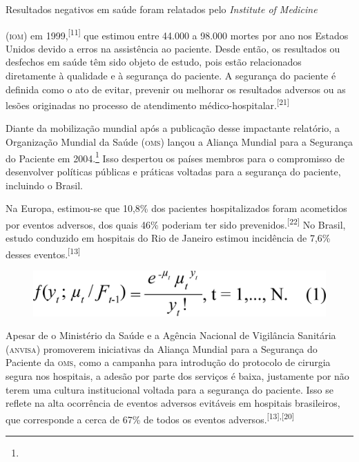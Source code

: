 \documentclass{article}
\begin{document}
Resultados negativos em saúde foram relatados pelo \textit{Institute of
Medicine}

(\textsc{iom}) em 1999,\textsuperscript{[}\textsuperscript{11}\textsuperscript{]}
que estimou entre 44.000 a 98.000 mortes por ano nos Estados Unidos devido a
erros
na assistência ao paciente. Desde então, os resultados ou desfechos em saúde têm
sido objeto
de estudo, pois estão relacionados diretamente à qualidade e à segurança do
paciente. A
segurança do paciente é definida como o ato de evitar, prevenir ou melhorar os
resultados
adversos ou as lesões originadas no processo de atendimento médico-hospitalar.\textsuperscript{[}\textsuperscript{21}\textsuperscript{]}

Diante da mobilização mundial após a publicação desse impactante relatório, a
Organização
Mundial da Saúde (\textsc{oms}) lançou a Aliança Mundial para a Segurança do Paciente em
2004.\footnote{}
Isso despertou os países membros para o compromisso de desenvolver políticas
públicas e práticas voltadas para a segurança do paciente, incluindo o Brasil.

Na Europa, estimou-se que 10,8\% dos pacientes hospitalizados foram acometidos
por eventos
adversos, dos quais 46\% poderiam ter sido prevenidos.\textsuperscript{[}\textsuperscript{22}\textsuperscript{]}
No Brasil, estudo conduzido em hospitais do Rio de Janeiro estimou incidência de
7,6\% desses eventos.\textsuperscript{[}\textsuperscript{13}\textsuperscript{]}

\begin{center}
\begin{figure}[h]
\includegraphics[width=.5\textwidth]{0034-8910-rsp-48-3-0451-ee01.jpg}
\end{figure}
\end{center}

Apesar de o Ministério da Saúde e a Agência Nacional de Vigilância Sanitária
(\textsc{anvisa})
promoverem iniciativas da Aliança Mundial para a Segurança do Paciente da \textsc{oms},
como a
campanha para introdução do protocolo de cirurgia segura nos hospitais, a adesão
por parte
dos serviços é baixa, justamente por não terem uma cultura institucional voltada
para a
segurança do paciente. Isso se reflete na alta ocorrência de eventos adversos
evitáveis em
hospitais brasileiros, que corresponde a cerca de 67\% de todos os eventos
adversos.\textsuperscript{[}\textsuperscript{13}\textsuperscript{]}\textsuperscript{,}\textsuperscript{[}\textsuperscript{20}\textsuperscript{]}
\end{document}
